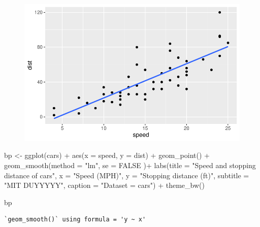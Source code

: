 \documentclass[
  letterpaper,
  DIV=11,
  numbers=noendperiod]{scrartcl}
\newenvironment{Shaded}{\begin{snugshade}}{\end{snugshade}}
\newcommand{\AttributeTok}[1]{\textcolor[rgb]{0.40,0.45,0.13}{#1}}
\newcommand{\ConstantTok}[1]{\textcolor[rgb]{0.56,0.35,0.01}{#1}}
\newcommand{\FunctionTok}[1]{\textcolor[rgb]{0.28,0.35,0.67}{#1}}
\newcommand{\NormalTok}[1]{\textcolor[rgb]{0.00,0.23,0.31}{#1}}
\newcommand{\OtherTok}[1]{\textcolor[rgb]{0.00,0.23,0.31}{#1}}
\newcommand{\SpecialCharTok}[1]{\textcolor[rgb]{0.37,0.37,0.37}{#1}}
\newcommand{\StringTok}[1]{\textcolor[rgb]{0.13,0.47,0.30}{#1}}
\begin{document}
\begin{figure}[H]

{\centering \includegraphics{class05_files/figure-pdf/unnamed-chunk-6-1.pdf}

}

\end{figure}

\begin{Shaded}
\begin{Highlighting}[]
\NormalTok{bp }\OtherTok{\textless{}{-}} \FunctionTok{ggplot}\NormalTok{(cars) }\SpecialCharTok{+}
  \FunctionTok{aes}\NormalTok{(}\AttributeTok{x =}\NormalTok{ speed, }\AttributeTok{y =}\NormalTok{ dist) }\SpecialCharTok{+}
  \FunctionTok{geom\_point}\NormalTok{() }\SpecialCharTok{+}
  \FunctionTok{geom\_smooth}\NormalTok{(}\AttributeTok{method =} \StringTok{"lm"}\NormalTok{, }\AttributeTok{se =} \ConstantTok{FALSE}\NormalTok{ )}\SpecialCharTok{+}
  \FunctionTok{labs}\NormalTok{(}\AttributeTok{title =} \StringTok{"Speed and stopping distance of cars"}\NormalTok{,}
      \AttributeTok{x =} \StringTok{"Speed (MPH)"}\NormalTok{, }
      \AttributeTok{y =} \StringTok{"Stopping distance (ft)"}\NormalTok{,}
      \AttributeTok{subtitle =} \StringTok{"MIT DUYYYYY"}\NormalTok{,}
      \AttributeTok{caption =} \StringTok{"Dataset = \textquotesingle{}cars\textquotesingle{}"}\NormalTok{) }\SpecialCharTok{+}
  \FunctionTok{theme\_bw}\NormalTok{()}

\NormalTok{bp}
\end{Highlighting}
\end{Shaded}

\begin{verbatim}
`geom_smooth()` using formula = 'y ~ x'
\end{verbatim}
\end{document}
